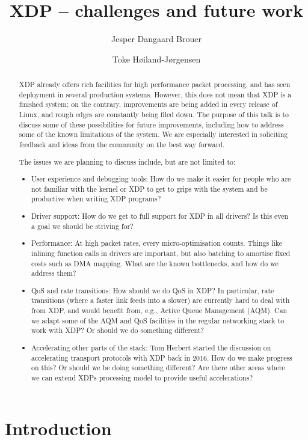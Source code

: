 \documentclass[sigconf]{acmart}
\begin{document}
\title{XDP -- challenges and future work}
\author{Jesper Dangaard Brouer}

\author{Toke Høiland-Jørgensen}


\captionsetup{font+=small}


\begin{abstract}
XDP already offers rich facilities for high performance packet
processing, and has seen deployment in several production
systems. However, this does not mean that XDP is a finished system; on
the contrary, improvements are being added in every release of Linux,
and rough edges are constantly being filed down. The purpose of this
talk is to discuss some of these possibilities for future
improvements, including how to address some of the known limitations
of the system. We are especially interested in soliciting feedback and
ideas from the community on the best way forward.

The issues we are planning to discuss include, but are not limited to:

\begin{itemize}
\item User experience and debugging tools: How do we make it easier for people
  who are not familiar with the kernel or XDP to get to grips with the system
  and be productive when writing XDP programs?

\item Driver support: How do we get to full support for XDP in all drivers? Is
  this even a goal we should be striving for?

\item Performance: At high packet rates, every micro-optimisation counts. Things
  like inlining function calls in drivers are important, but also batching to
  amortise fixed costs such as DMA mapping. What are the known bottlenecks, and
  how do we address them?

\item QoS and rate transitions: How should we do QoS in XDP? In particular, rate
  transitions (where a faster link feeds into a slower) are currently hard to
  deal with from XDP, and would benefit from, e.g., Active Queue Management
  (AQM). Can we adapt some of the AQM and QoS facilities in the regular
  networking stack to work with XDP? Or should we do something different?

\item Accelerating other parts of the stack: Tom Herbert started the discussion
  on accelerating transport protocols with XDP back in 2016. How do we make
  progress on this? Or should we be doing something different? Are there other
  areas where we can extend XDPs processing model to provide useful
  accelerations?
\end{itemize}

\end{abstract}


\maketitle

\section{Introduction}%
\label{sec:introduction}



\end{document}
